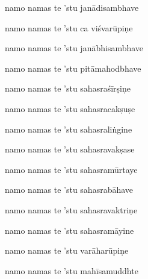 \ujvers\nemsloka 
namo namas te 'stu janādisambhave
\dontdisplaylinenum

\nemslokab 
namo namas te 'stu ca viśvarūpiṇe \danda\dontdisplaylinenum

\nemslokac 
namo namas te 'stu janābhisambhave
\dontdisplaylinenum

\nemslokad 
namo namas te 'stu pitāmahodbhave \veg\dontdisplaylinenum
{}

\ujvers\nemsloka 
namo namas te 'stu sahasraśīrṣiṇe
\dontdisplaylinenum

\nemslokab 
namo namas te 'stu sahasracakṣuṣe \danda\dontdisplaylinenum

\nemslokac 
namo namas te 'stu sahasraliṅgine
\dontdisplaylinenum

\nemslokad 
namo namas te 'stu sahasravakṣase \veg\dontdisplaylinenum
{}

\ujvers\nemsloka 
namo namas te 'stu sahasramūrtaye
\dontdisplaylinenum

\nemslokab 
namo namas te 'stu sahasrabāhave \danda\dontdisplaylinenum

\nemslokac 
namo namas te 'stu sahasravaktriṇe
\dontdisplaylinenum

\nemslokad 
namo namas te 'stu sahasramāyine \veg\dontdisplaylinenum
{}

\ujvers\nemsloka 
namo namas te 'stu varāharūpiṇe
\dontdisplaylinenum

\nemslokab 
namo namas te 'stu mahīsamuddhte \danda\dontdisplaylinenum


